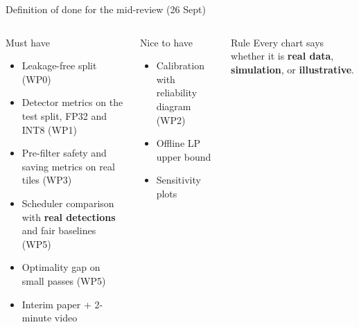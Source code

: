 \documentclass[aspectratio=169,10pt]{beamer}
\newcommand{\ok}{\textcolor{good}{$\checkmark$}}
\begin{document}
\begin{frame}{Definition of done for the mid-review (26 Sept)}
\begin{columns}[T]
\begin{block}{Must have}
\footnotesize
\begin{itemize}
  \item[\ok] Leakage-free split (WP0)
  \item[\ok] Detector metrics on the test split, FP32 and INT8 (WP1)
  \item[\ok] Pre-filter safety and saving metrics on real tiles (WP3)
  \item[\ok] Scheduler comparison with \textbf{real detections} and fair baselines (WP5)
  \item[\ok] Optimality gap on small passes (WP5)
  \item[\ok] Interim paper + 2-minute video
\end{itemize}
\end{block}
\begin{block}{Nice to have}
\footnotesize
\begin{itemize}
  \item Calibration with reliability diagram (WP2)
  \item Offline LP upper bound
  \item Sensitivity plots
\end{itemize}
\end{block}
\begin{alertblock}{Rule}
\footnotesize Every chart says whether it is \textbf{real data}, \textbf{simulation}, or \textbf{illustrative}.
\end{alertblock}
\end{columns}
\end{frame}

\end{document}
